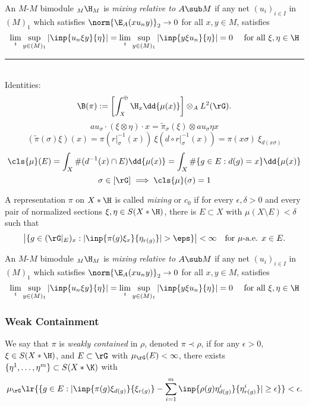 \documentclass[../main.tex]{subfiles}
\begin{document}
\begin{definition}
 An $ M $-$ M $ bimodule $ _M \H_{M} $ is {\it mixing relative to $ A\sub M $} if any net $ (u_{i})_{i\in I} $ in $ (M)_{1} $ which satisfies $ \norm{\E_{A}(xu_{n}y)}_{2}\to 0 $ for all $ x,y\in M $, satisfies
\[
    \lim_{i} \sup_{y\in(M)_{1}} |\inp{u_{n} \xi y}{\eta}| =\lim_{i} \sup_{y\in(M)_{1}} |\inp{y \xi u_{n} }{\eta}| =  0 \quad\text{ for all } \xi, \eta\in \H
\]
\end{definition}

\rule{14cm}{1pt}\\
Identities:
\[
  \B(\pi) := \left[ \int_{X}^{\oplus}\H_{x}\dd{\mu(x)}\right] \otimes_{A} L^{2}(\rG).
\]
\[
    au_{\sigma}\cdot (\xi \otimes \eta) \cdot x = \widetilde{\pi}_{\sigma}(\xi)\otimes au_{\sigma}\eta x
\]
\[
    (\widetilde{\pi}(\sigma) \xi)(x) = \pi(r\vert_{\sigma}^{-1}(x)) \ \xi(d\circ r\vert_{\sigma}^{-1}(x))=\pi(x \sigma) \ \xi_{d(x \sigma)}
\]
\[
    \cls{\mu}(E) = \int_{X} \#(d^{-1}(x)\cap E) \dd{\mu(x)}= \int_{X} \#\{g\in E: d(g) = x\} \dd{\mu(x)}
\]
\[
    \sigma\in[\rG] \implies \cls{\mu}(\sigma) = 1
\]

\begin{definition}
 A representation $\pi$ on $X \ast \H$ is called {\it mixing} or $c_0$ if 
for every $\epsilon, \delta > 0$ and every pair of normalized sections $\xi, \eta \in S(X \ast \H)$, there is $E \subset X$ with $\mu(X \setminus E) < \delta$ such that 
$$
\left| \{g \in (\rG\vert_E)_x : |\inp{\pi(g)\xi_x}{\eta_{r(g)}} | > \eps\}\right| < \infty  \quad \text{for $\mu$-a.e. $x \in E$.}
$$
\end{definition}

\begin{definition}
 An $ M $-$ M $ bimodule $ _M \H_{M} $ is {\it mixing relative to $ A\sub M $} if any net $ (u_{i})_{i\in I} $ in $ (M)_{1} $ which satisfies $ \norm{\E_{A}(xu_{n}y)}_{2}\to 0 $ for all $ x,y\in M $, satisfies
\[
    \lim_{i} \sup_{y\in(M)_{1}} |\inp{u_{n} \xi y}{\eta}| =\lim_{i} \sup_{y\in(M)_{1}} |\inp{y \xi u_{n} }{\eta}| =  0 \quad\text{ for all } \xi, \eta\in \H
\]
\end{definition}

\subsubsection{Weak Containment}

\begin{definition}
We say that $\pi$ is {\it weakly contained} in $\rho$, denoted $\pi \prec \rho$, if for any $\epsilon > 0$, $\xi \in S(X \ast \H)$, and $E \subset \rG$ with $\mu_\rG(E) < \infty$, there exists $\{\eta^1, \dots, \eta^m\} \subset S(X \ast \K)$ with
$$
\mu_\rG\lr{\{g\in E : |\inp{ \pi(g)\xi_{d(g)}}{\xi_{r(g)}} - \sum_{i = 1}^m \inp{\rho(g)\eta^i_{d(g)}}{ \eta^i_{r(g)}} | \ge \epsilon\}} < \epsilon.
$$
\end{definition}
\end{document}
